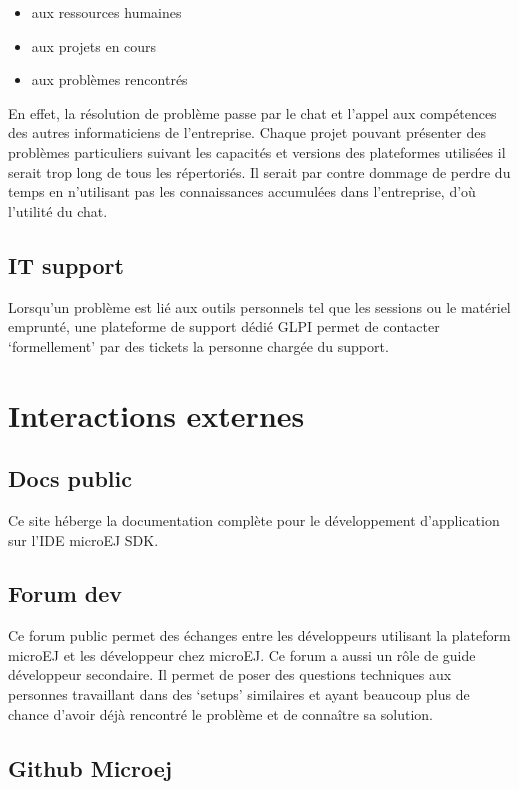 \documentclass[french,a4paper,12pt]{report}
\begin{document}
\begin{itemize}
\setcounter{enumi}{-1}
\item aux ressources humaines
\item aux projets en cours
\item aux problèmes rencontrés
\end{itemize}

En effet, la résolution de problème passe par le chat et l'appel aux compétences des autres informaticiens de l’entreprise. Chaque projet pouvant présenter des problèmes particuliers suivant les capacités et versions des plateformes utilisées il serait trop long de tous les répertoriés. Il serait par contre dommage de perdre du temps en n’utilisant pas les connaissances accumulées dans l’entreprise, d'où l'utilité du chat. 

\subsection{IT support}

Lorsqu’un problème est lié aux outils personnels tel que les sessions ou le matériel emprunté, une plateforme de support dédié GLPI permet de contacter ‘formellement’ par des tickets la personne chargée du support.

\section{Interactions externes}
\subsection{Docs public}

Ce site héberge la documentation complète pour le développement d’application sur l’IDE microEJ SDK.

\subsection{Forum dev}

Ce forum public permet des échanges entre les développeurs utilisant la plateform microEJ et les développeur chez microEJ. Ce forum a aussi un rôle de guide développeur secondaire. Il permet de poser des questions techniques aux personnes travaillant dans des ‘setups’ similaires et ayant beaucoup plus de chance d’avoir déjà rencontré le problème et de connaître sa solution.

\subsection{Github Microej}
\end{document}
